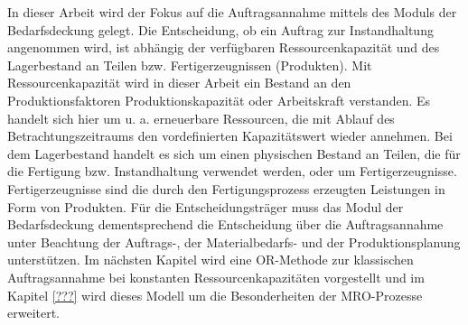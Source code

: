 In dieser Arbeit wird der Fokus auf die Auftragsannahme mittels des Moduls der Bedarfsdeckung gelegt. Die Entscheidung, ob ein Auftrag zur Instandhaltung angenommen wird, ist abhängig der verfügbaren Ressourcenkapazität und des Lagerbestand an Teilen bzw. Fertigerzeugnissen (Produkten). %
Mit Ressourcenkapazität wird in dieser Arbeit ein Bestand an den Produktionsfaktoren Produktionskapazität oder Arbeitskraft verstanden. Es handelt sich hier um u. a. erneuerbare Ressourcen, die mit Ablauf des Betrachtungszeitraums den vordefinierten Kapazitätswert wieder annehmen. Bei dem Lagerbestand handelt es sich um einen physischen Bestand an Teilen, die für die Fertigung bzw. Instandhaltung verwendet werden, oder um Fertigerzeugnisse. Fertigerzeugnisse sind die durch den Fertigungsprozess erzeugten Leistungen in Form von Produkten. Für die Entscheidungsträger muss das Modul der Bedarfsdeckung dementsprechend die Entscheidung über die Auftragsannahme unter Beachtung der Auftrags-, der Materialbedarfs- und der Produktionsplanung unterstützen. Im nächsten Kapitel wird eine OR-Methode zur klassischen Auftragsannahme bei konstanten Ressourcenkapazitäten vorgestellt und im Kapitel \ref{???} wird dieses Modell um die Besonderheiten der MRO-Prozesse erweitert.





